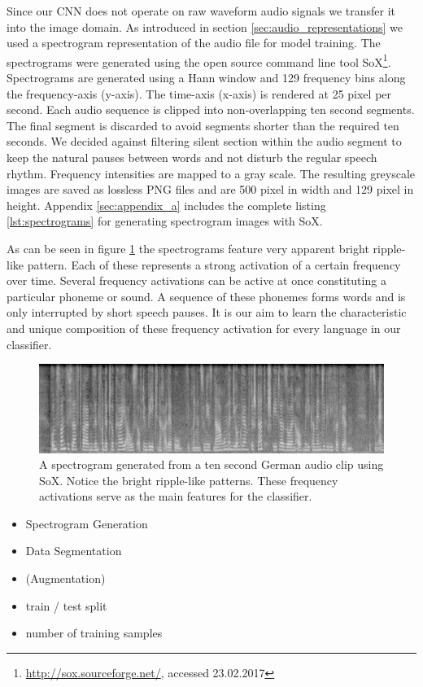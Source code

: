 	Since our CNN does not operate on raw waveform audio signals we transfer it into the image domain. As introduced in section \ref{sec:audio_representations} we used a spectrogram representation of the audio file for model training. The spectrograms were generated using the open source command line tool SoX\footnote{\url{http://sox.sourceforge.net/}, accessed 23.02.2017}. Spectrograms are generated using a Hann window and 129 frequency bins along the frequency-axis (y-axis). The time-axis (x-axis) is rendered at 25 pixel per second. Each audio sequence is clipped into non-overlapping ten second segments. The  final segment is discarded to avoid segments shorter than the required ten seconds. We decided against filtering silent section within the audio segment to keep the natural pauses between words and not disturb the regular speech rhythm. Frequency intensities are mapped to a gray scale. The resulting greyscale images are saved as lossless PNG files and are 500 pixel in width and 129 pixel in height. Appendix \ref{sec:appendix_a} includes the complete listing \ref{lst:spectrograms} for generating spectrogram images with SoX.
	
	As can be seen in figure \ref{fig:spectrogram} the spectrograms feature very apparent bright ripple-like pattern. Each of these represents a strong activation of a certain frequency over time. Several frequency activations can be active at once constituting a particular phoneme or sound. A sequence of these phonemes forms words and is only interrupted by short speech pauses. It is our aim to learn the characteristic and unique composition of these frequency activation for every language in our classifier. 

	
	\begin{figure}[h]
  		\centering
    	\includegraphics[width=\textwidth,keepaspectratio]{img/spectrogram.png}
    	\caption{A spectrogram generated from a ten second German audio clip  using SoX. Notice the bright ripple-like patterns. These frequency activations serve as the main features for the classifier.}
    	\label{fig:spectrogram}
	\end{figure}
	
    \begin{itemize}
        \item Spectrogram Generation
        \item Data Segmentation
        \item (Augmentation)
        \item train / test split
		\item number of training samples
    \end{itemize}


